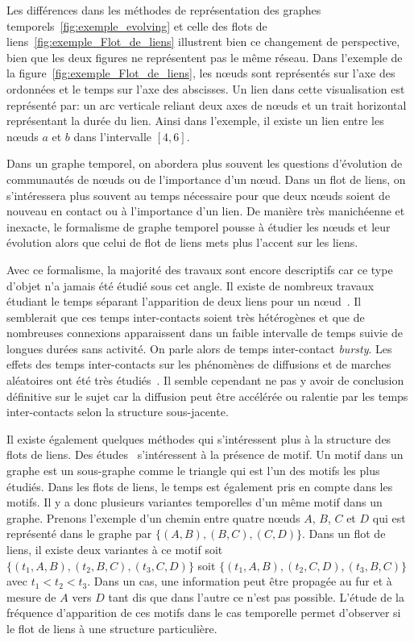 Les différences dans les méthodes de représentation des graphes temporels~\ref{fig:exemple_evolving} et celle des flots de liens~\ref{fig:exemple_Flot_de_liens} illustrent bien ce changement de perspective, bien que les deux figures ne représentent pas le même réseau.
Dans l'exemple de la figure~\ref{fig:exemple_Flot_de_liens}, les n\oe uds sont représentés sur l'axe des ordonnées et le temps sur l'axe des abscisses.
Un lien dans cette visualisation est représenté par: un arc verticale reliant deux axes de n\oe uds et un trait horizontal représentant la durée du lien.
Ainsi dans l'exemple, il existe un lien entre les n\oe uds $a$ et $b$ dans l'intervalle $[4,6]$.

Dans un graphe temporel, on abordera plus souvent les questions d'évolution de communautés de n\oe uds ou de l'importance d'un n\oe ud.
Dans un flot de liens, on s'intéressera plus souvent au temps nécessaire pour que deux n\oe uds soient de nouveau en contact ou à l'importance d'un lien.
De manière très manichéenne et inexacte, le formalisme de graphe temporel pousse à étudier les n\oe uds et leur évolution alors que celui de flot de liens mets plus l'accent sur les liens.

\bigskip



Avec ce formalisme, la majorité des travaux sont encore descriptifs car ce type d'objet n'a jamais été étudié sous cet angle.
Il existe de nombreux travaux étudiant le temps séparant l'apparition de deux liens pour un n\oe ud~\cite{Malmgren2008,Malmgren2009}.
Il semblerait que ces temps inter-contacts soient très hétérogènes et que de nombreuses connexions apparaissent dans un faible intervalle de temps suivie de longues durées sans activité.
On parle alors de temps inter-contact \emph{bursty}.
Les effets des temps inter-contacts sur les phénomènes de diffusions et de marches aléatoires ont été très étudiés~\cite{Karsai2011,Karsai2012a,Starnini2012b,Rocha2013}.
Il semble cependant ne pas y avoir de conclusion définitive sur le sujet car la diffusion peut être accélérée ou ralentie par les temps inter-contacts selon la structure sous-jacente.

Il existe également quelques méthodes qui s'intéressent plus à la structure des flots de liens.
Des études~\cite{Kovanen2011a,Kovanen2013} s'intéressent à la présence de motif.
Un motif dans un graphe est un sous-graphe comme le triangle qui est l'un des motifs les plus étudiés.
Dans les flots de liens, le temps est également pris en compte dans les motifs.
Il y a donc plusieurs variantes temporelles d'un même motif dans un graphe.
Prenons l'exemple d'un chemin entre quatre n\oe uds $A$, $B$, $C$ et $D$ qui est représenté dans le graphe par  $\{(A,B), (B,C), (C,D)\}$.
Dans un flot de liens, il existe deux variantes à ce motif soit
$\{(t_1,A,B), (t_2,B,C), (t_3,C,D)\}$ soit $\{(t_1,A,B), (t_2,C,D), (t_3,B,C)\}$ avec $t_1<t_2<t_3$.
Dans un cas,  une information peut être propagée au fur et à mesure de $A$ vers $D$ tant dis que dans l'autre ce n'est pas possible.
L'étude de la fréquence d'apparition de ces motifs dans le cas temporelle permet d'observer si le flot de liens à une structure particulière. 



